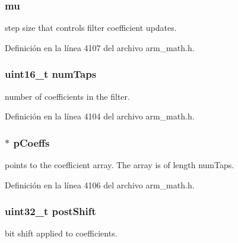 \subsubsection[{\texorpdfstring{mu}{mu}}]{ mu}\hypertarget{structarm__lms__instance__q31_a21ab4237a726ea7751f5026d89d2e577}{}\label{structarm__lms__instance__q31_a21ab4237a726ea7751f5026d89d2e577}
step size that controls filter coefficient updates. 

Definición en la línea 4107 del archivo arm\+\_\+math.\+h.

\subsubsection[{\texorpdfstring{num\+Taps}{numTaps}}]{\setlength{\rightskip}{0pt plus 5cm}uint16\+\_\+t num\+Taps}\hypertarget{structarm__lms__instance__q31_a751941891e47f522a7f5375fe8990aac}{}\label{structarm__lms__instance__q31_a751941891e47f522a7f5375fe8990aac}
number of coefficients in the filter. 

Definición en la línea 4104 del archivo arm\+\_\+math.\+h.

\subsubsection[{\texorpdfstring{p\+Coeffs}{pCoeffs}}]{$\ast$ p\+Coeffs}\hypertarget{structarm__lms__instance__q31_a68888e36167d81cb7836db10367a1682}{}\label{structarm__lms__instance__q31_a68888e36167d81cb7836db10367a1682}
points to the coefficient array. The array is of length num\+Taps. 

Definición en la línea 4106 del archivo arm\+\_\+math.\+h.

\subsubsection[{\texorpdfstring{post\+Shift}{postShift}}]{\setlength{\rightskip}{0pt plus 5cm}uint32\+\_\+t post\+Shift}\hypertarget{structarm__lms__instance__q31_aa2cacddfc5e1d86905d7d31a18b1979b}{}\label{structarm__lms__instance__q31_aa2cacddfc5e1d86905d7d31a18b1979b}
bit shift applied to coefficients. 

